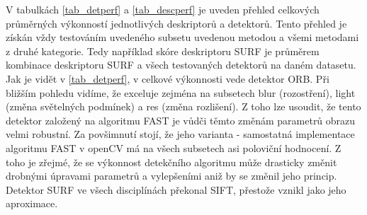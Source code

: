 %
%
%







V tabulkách \ref{tab_detperf} a \ref{tab_descperf} je uveden přehled celkových průměrných výkonností jednotlivých deskriptorů
a detektorů. Tento přehled je získán vždy testováním uvedeného subsetu uvedenou metodou a všemi
metodami z druhé kategorie. Tedy například skóre deskriptoru SURF je průměrem kombinace
deskriptoru SURF a všech testovaných detektorů na daném datasetu.
Jak je vidět v \ref{tab_detperf}, v celkové výkonnosti vede detektor ORB. Při bližším pohledu vidíme, že exceluje
zejména na subsetech blur (rozostření), light (změna světelných podmínek) a res (změna rozlišení).
Z toho lze usoudit, že tento detektor založený na algoritmu FAST je vůdči těmto změnám parametrů obrazu
velmi robustní. Za povšimnutí stojí, že jeho varianta - samostatná implementace algoritmu FAST 
v openCV má na všech subsetech asi poloviční hodnocení. Z toho je zřejmé, že se výkonnost detekčního
algoritmu může drasticky změnit drobnými úpravami parametrů a vylepšeními aniž by se změnil jeho princip.
Detektor SURF ve všech disciplínách překonal SIFT, přestože vznikl jako jeho aproximace.

